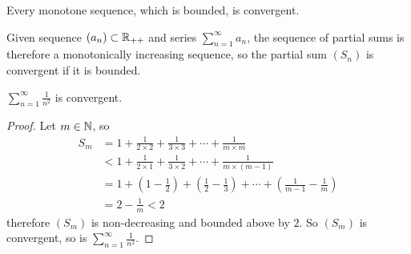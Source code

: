 \documentclass[11pt]{article}
\newcommand{\ser}[2]{\sum_{{#2}=1}^\infty {#1}_{#2}}
\begin{document}
        \begin{theorem}
            Every monotone sequence, which is bounded, is convergent.
        \end{theorem}
        
        \begin{corollary}
            Given sequence $(a_n) \subset \mathbb{R}_{++}$ and series $\ser{a}{n}$, the sequence of partial sums is therefore a monotonically increasing sequence, so the partial sum $(S_n)$ is convergent if it is bounded.
        \end{corollary}
        
        \begin{example}
            $\sum_{n=1}^\infty \frac{1}{n^2}$ is convergent.
        \end{example}
        
        \begin{proof}
            Let $m \in \mathbb{N}$, so
            \begin{align}
                S_m &= 1 + \frac{1}{2\times 2} + \frac{1}{3 \times 3} + \cdots + \frac{1}{m \times m} \\
                &< 1 + \frac{1}{2\times 1} + \frac{1}{3\times 2} + \cdots + \frac{1}{m \times (m-1)} \\
                &= 1 + (1-\frac{1}{2}) + (\frac{1}{2} - \frac{1}{3}) + \cdots + (\frac{1}{m-1} - \frac{1}{m}) \\
                &= 2 - \frac{1}{m} < 2
            \end{align}
            therefore $(S_m)$ is non-decreasing and bounded above by $2$. So $(S_m)$ is convergent, so is  $\sum_{n=1}^\infty \frac{1}{n^2}$.
        \end{proof}
\end{document}
